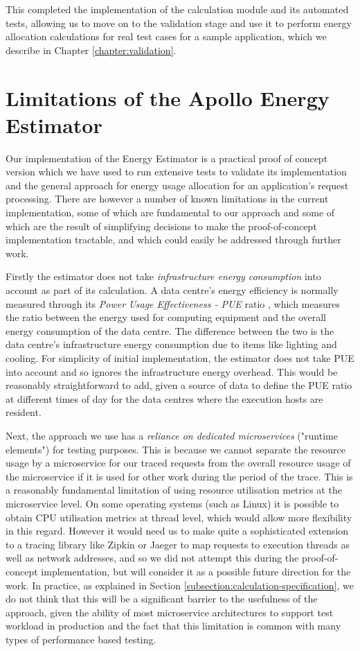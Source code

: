 This completed the implementation of the calculation module and its automated tests, allowing us to move on to the validation stage and use it to perform energy allocation calculations for real test cases for a sample application, which we describe in Chapter \ref{chapter:validation}.

\section{Limitations of the Apollo Energy Estimator}

Our implementation of the Energy Estimator is a practical proof of concept version which we have used to run extensive tests to validate its implementation and the general approach for energy usage allocation for an application's request processing.  There are however a number of known limitations in the current implementation, some of which are fundamental to our approach and some of which are the result of simplifying decisions to make the proof-of-concept implementation tractable, and which could easily be addressed through further work.

Firstly the estimator does not take \emph{infrastructure energy consumption} into account as part of its calculation.  A data centre's energy efficiency is normally measured through its \emph{Power Usage Effectiveness - PUE} ratio \cite{iso30134-pue}, which measures the ratio between the energy used for computing equipment and the overall energy consumption of the data centre.  The difference between the two is the data centre's infrastructure energy consumption due to items like lighting and cooling.  For simplicity of initial implementation, the estimator does not take PUE into account and so ignores the infrastructure energy overhead.  This would be reasonably straightforward to add, given a source of data to define the PUE ratio at different times of day for the data centres where the execution hosts are resident.

Next, the approach we use has a \emph{reliance on dedicated microservices} ("runtime elements") for testing purposes.  This is because we cannot separate the resource usage by a microservice for our traced requests from the overall resource usage of the microservice if it is used for other work during the period of the trace.  This is a reasonably fundamental limitation of using resource utilisation metrics at the microservice level.  On some operating systems (such as Linux) it is possible to obtain CPU utilisation metrics at thread level, which would allow more flexibility in this regard.  However it would need us to make quite a sophisticated extension to a tracing library like Zipkin or Jaeger to map requests to execution threads as well as network addresses, and so we did not attempt this during the proof-of-concept implementation, but will consider it as a possible future direction for the work.  In practice, as explained in Section \ref{subsection:calculation-specification}, we do not think that this will be a significant barrier to the usefulness of the approach, given the ability of most microservice architectures to support test workload in production and the fact that this limitation is common with many types of performance based testing.

